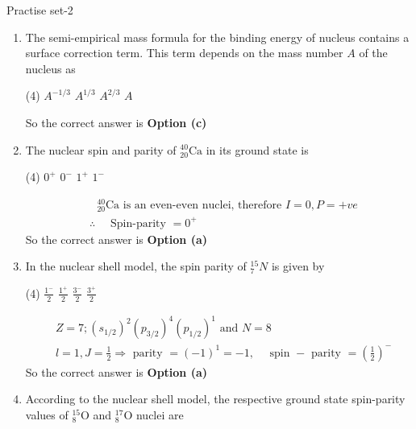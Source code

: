 \newpage
\begin{abox}
	Practise set-2
\end{abox}
\begin{enumerate}
	\item The semi-empirical mass formula for the binding energy of nucleus contains a surface correction term. This term depends on the mass number $A$ of the nucleus as
	{}
	\begin{tasks}(4)
		\task[\textbf{a.}]$A^{-1 / 3}$
		\task[\textbf{b.}]$A^{1 / 3}$
		\task[\textbf{c.}]$A^{2 / 3}$
		\task[\textbf{d.}] $A$
	\end{tasks}
	\begin{answer}
		So the correct answer is \textbf{Option (c)}
	\end{answer}
	\item  The nuclear spin and parity of ${ }_{20}^{40} \mathrm{Ca}$ in its ground state is
	{}
	\begin{tasks}(4)
		\task[\textbf{a.}]$0^{+}$
		\task[\textbf{b.}]$0^{-}$
		\task[\textbf{c.}]$1^{+}$
		\task[\textbf{d.}] $1^{-}$
	\end{tasks}
	\begin{answer}
		\begin{align*}
		&\text{ ${ }_{20}^{40} \mathrm{Ca}$ is an even-even nuclei, therefore $I=0, P=+v e$}\\
		&\therefore \quad \text { Spin-parity }=0^{+}
		\end{align*}
		So the correct answer is \textbf{Option (a)}
	\end{answer}
	\item  In the nuclear shell model, the spin parity of ${ }_7^{15} N$ is given by
	{}
	\begin{tasks}(4)
		\task[\textbf{a.}]$\frac{1^{-}}{2}$
		\task[\textbf{b.}]$\frac{1^{+}}{2}$
		\task[\textbf{c.}]$\frac{3^{-}}{2}$
		\task[\textbf{d.}]$\frac{3^{+}}{2}$
	\end{tasks}
	\begin{answer}
		\begin{align*}
		&\text{$Z=7 ;\left(s_{1 / 2}\right)^2\left(p_{3 / 2}\right)^4\left(p_{1 / 2}\right)^1$ and $N=8$}\\
		&l=1, J=\frac{1}{2} \Rightarrow \text { parity }=(-1)^1=-1, \quad \text { spin }-\text { parity }=\left(\frac{1}{2}\right)^{-}
		\end{align*}
		So the correct answer is \textbf{Option (a)}
	\end{answer}
	\item  According to the nuclear shell model, the respective ground state spin-parity values of ${ }_8^{15} \mathrm{O}$ and ${ }_8^{17} \mathrm{O}$ nuclei are

\end{enumerate}
